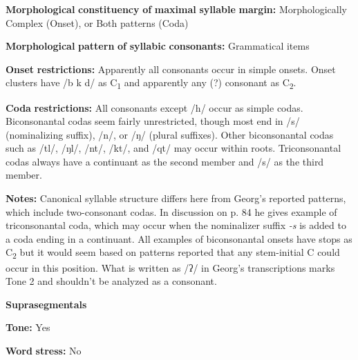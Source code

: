 \documentclass[output=paper]{langsci/langscibook}
\begin{document}
\begin{styleBody}
\textbf{Morphological} \textbf{constituency} \textbf{of} \textbf{maximal} \textbf{syllable} \textbf{margin:} Morphologically Complex (Onset), or Both patterns (Coda)
\end{styleBody}

\begin{styleBody}
\textbf{Morphological} \textbf{pattern} \textbf{of} \textbf{syllabic} \textbf{consonants:} Grammatical items
\end{styleBody}

\begin{styleBody}
\textbf{Onset} \textbf{restrictions:} Apparently all consonants occur in simple onsets. Onset clusters have /b k d/ as C\textsubscript{1} and apparently any (?) consonant as C\textsubscript{2}.
\end{styleBody}

\begin{styleBody}
\textbf{Coda} \textbf{restrictions:} All consonants except /h/ occur as simple codas. Biconsonantal codas seem fairly unrestricted, though most end in /s/ (nominalizing suffix), /n/, or /ŋ/ (plural suffixes). Other biconsonantal codas such as /tl/, /ŋl/, /nt/, /kt/, and /qt/ may occur within roots. Triconsonantal codas always have a continuant as the second member and /s/ as the third member.
\end{styleBody}

\begin{styleBody}
\textbf{Notes:} Canonical syllable structure differs here from Georg’s reported patterns, which include two-consonant codas. In discussion on p. 84 he gives example of triconsonantal coda, which may occur when the nominalizer suffix \textit{{}-s} is added to a coda ending in a continuant. All examples of biconsonantal onsets have stops as C\textsubscript{2} but it would seem based on patterns reported that any stem-initial C could occur in this position. What is written as /ʔ/ in Georg’s transcriptions marks Tone 2 and shouldn’t be analyzed as a consonant.
\end{styleBody}

\begin{styleBody}
\textbf{Suprasegmentals}
\end{styleBody}

\begin{styleBody}
\textbf{Tone:} Yes
\end{styleBody}

\begin{styleBody}
\textbf{Word} \textbf{stress:} No
\end{styleBody}
\end{document}
